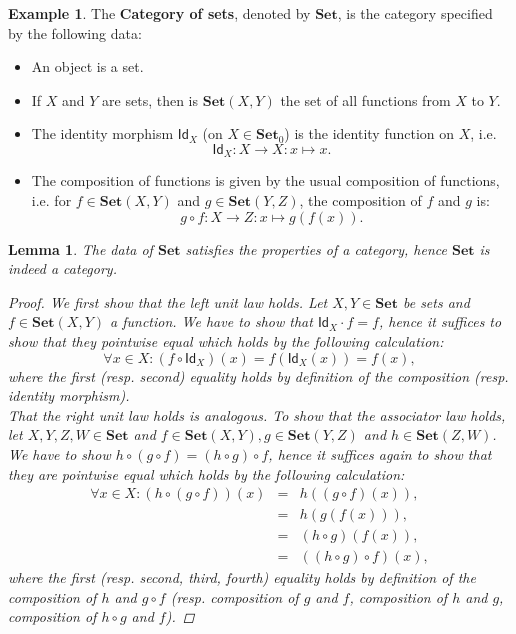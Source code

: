 \documentclass[a4paper,10pt]{scrartcl}
\theoremstyle{plain}
\newtheorem{lemma}[thm]{Lemma}
\theoremstyle{definition}
\newtheorem{exa}[thm]{Example}
\newcommand{\cfont}[1]{\ensuremath{\mathsf{#1}}}
\newcommand{\Catb}[1]{\mathbf{#1}}
\newcommand{\SET}{\Catb{Set}}
\newcommand{\Ob}[1]{{#1}_0}
\newcommand{\CHom}[3]{{#1}(#2,#3)}
\newcommand{\Id}[1][]{\cfont{Id}_{#1}}
\newcommand{\Comp}{\cdot}
\begin{document}
\begin{exa}\label{example:set} The \textbf{Category of sets}, denoted by $\SET$, is the category specified by the following data:
\begin{itemize}
\item An object is a set.
\item If $X$ and $Y$ are sets, then is $\CHom \SET X Y$ the set of all functions from $X$ to $Y$.
\item The identity morphism $\Id[X]$ (on $X\in\Ob{\SET}$) is the identity function on $X$, i.e.
\[
\Id[X] : X\to X: x \mapsto x.
\]
\item The composition of functions is given by the usual composition of functions, i.e. for $f\in \CHom \SET X Y$ and $g\in \CHom \SET Y Z$, the composition of $f$ and $g$ is:
$$g \circ f : X\to Z: x\mapsto g(f(x)).$$
\end{itemize}
\end{exa}
\begin{lemma} The data of $\SET$ satisfies the properties of a category, hence $\SET$ is indeed a category.
\begin{proof}
We first show that the left unit law holds. Let $X,Y\in \mathbf{Set}$ be sets and $f\in \CHom \SET X Y$ a function. We have to show that $\Id[X] \Comp f = f$, hence it suffices to show that they pointwise equal which holds by the following calculation:
\[
\forall x\in X: (f\circ \Id[X])(x) = f\left(\Id[X](x)\right) = f(x),
\]
where the first (resp. second) equality holds by definition of the composition (resp. identity morphism).\\
That the right unit law holds is analogous. To show that the associator law holds, let $X,Y,Z,W\in\mathbf{Set}$ and $f\in \CHom \SET X Y, g\in \CHom \SET Y Z$ and $h\in \CHom \SET Z W$. We have to show $h\circ (g\circ f) = (h\circ g)\circ f$, hence it suffices again to show that they are pointwise equal which holds by the following calculation:
\begin{eqnarray*}
\forall x\in X: \left(h\circ (g\circ f)\right)(x) &=& h\left((g\circ f)(x)\right), \\ 
	&=& h(g(f(x))),\\ 
	&=& (h\circ g)(f(x)),\\ 
	&=& \left((h\circ g)\circ f\right)(x),
\end{eqnarray*}
where the first (resp. second, third, fourth) equality holds by definition of the composition of $h$ and $g\circ f$ (resp. composition of $g$ and $f$, composition of $h$ and $g$, composition of $h\circ g$ and $f$).
\end{proof}
\end{lemma}
\end{document}
